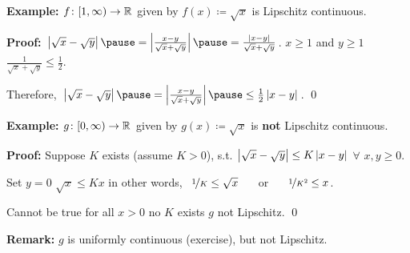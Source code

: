 \documentclass[10pt,aspectratio=169]{beamer}
\begin{document}
\begin{frame}
\textbf{Example:}
$f \colon [1,\infty) \to {\mathbb{R}}$ given by $f(x) \coloneqq \sqrt{x}$
is Lipschitz continuous.

\pause
\medskip

\textbf{Proof:}
$
\abs{\sqrt{x}-\sqrt{y}}
\pause
= 
\abs{\frac{x-y}{\sqrt{x}+\sqrt{y}}}
\pause
=
\frac{\abs{x-y}}{\sqrt{x}+\sqrt{y}}$.
\pause
\qquad
$x \geq 1$ and $y \geq 1$
\wthus $\frac{1}{\sqrt{x}+\sqrt{y}}
\leq \frac{1}{2}$.

\pause
Therefore, \quad
$\abs{\sqrt{x}-\sqrt{y}}
\pause
= 
\abs{\frac{x-y}{\sqrt{x}+\sqrt{y}}}
\pause
\leq
\frac{1}{2}
\abs{x-y}$.
\qed


\pause
\medskip

\textbf{Example:}
$g \colon [0,\infty) \to {\mathbb{R}}$ given by
$g(x) \coloneqq \sqrt{x}$ is \textbf{not} Lipschitz continuous.

\pause
\medskip

\textbf{Proof:}
Suppose $K$ exists (assume $K>0$), s.t. 
$\left\lvert {\sqrt{x}-\sqrt{y}} \right\rvert 
\leq
K \left\lvert {x-y} \right\rvert$ $\forall$ $x,y \geq 0$.

\pause
\medskip

Set $y=0$ \wthus $\sqrt{x} \leq K x$
\qquad
\pause
in other words,
~$\nicefrac{1}{K} \leq \sqrt{x}$ ~~ or ~~ $\nicefrac{1}{K^2} \leq x$.

\pause
Cannot be true for all $x > 0$ \wthus no $K$ exists
\pause
\wthus
$g$ not Lipschitz.
\qed
\pause


\hspace*{\fill}
\hspace*{\fill}

\pause
\medskip

\textbf{Remark:} $g$ is uniformly continuous (exercise), but not Lipschitz.

\end{frame}
\end{document}
